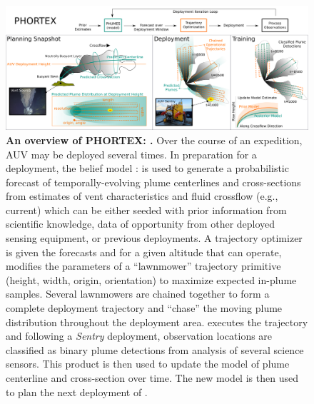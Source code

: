 \begin{figure}
    \centering
    \includegraphics[width=\columnwidth]{figures/summary_intro_figure.png}
    \caption[An overview of \PHORTEX: \phortex.]{\textbf{An overview of PHORTEX: \phortex.} Over the course of an expedition, AUV \Sentry may be deployed several times. In preparation for a deployment, the belief model \PHUMES: \phumes is used to generate a probabilistic forecast of temporally-evolving plume centerlines and cross-sections from estimates of vent characteristics and fluid crossflow (e.g., current) which can be either seeded with prior information from scientific knowledge, data of opportunity from other deployed sensing equipment, or previous \Sentry deployments. A trajectory optimizer is given the forecasts and for a given altitude that \Sentry can operate, modifies the parameters of a ``lawnmower'' trajectory primitive (height, width, origin, orientation) to maximize expected in-plume samples. Several lawnmowers are chained together to form a complete deployment trajectory and ``chase'' the moving plume distribution throughout the deployment area. \Sentry executes the trajectory and following a \emph{Sentry} deployment, observation locations are classified as binary plume detections from analysis of several science sensors. This product is then used to update the \PHUMES model of plume centerline and cross-section over time. The new \PHUMES model is then used to plan the next deployment of \Sentry.}
    \label{fig:intro_summary}
\end{figure}


